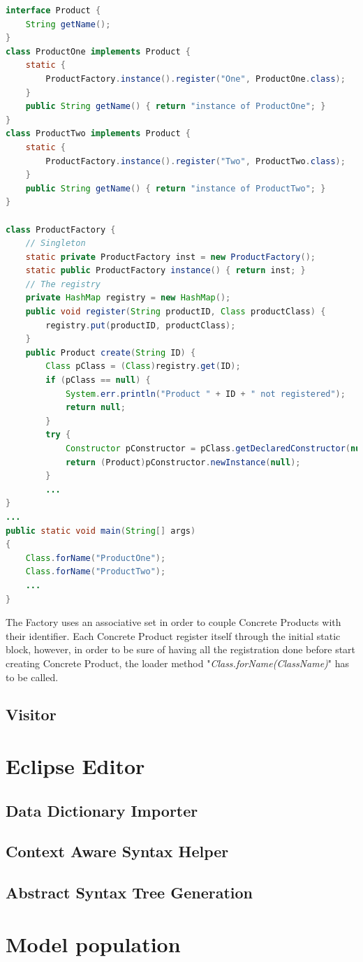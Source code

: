 \begin{lstlisting}[language=Java]
interface Product {
	String getName();
}
class ProductOne implements Product {
	static {
		ProductFactory.instance().register("One", ProductOne.class);
	}
	public String getName() { return "instance of ProductOne"; }
}
class ProductTwo implements Product {
	static {
		ProductFactory.instance().register("Two", ProductTwo.class);
	}
	public String getName() { return "instance of ProductTwo"; }
}

class ProductFactory {
	// Singleton
	static private ProductFactory inst = new ProductFactory();
	static public ProductFactory instance() { return inst; }
	// The registry
	private HashMap registry = new HashMap();
	public void register(String productID, Class productClass) {
		registry.put(productID, productClass);
	}
	public Product create(String ID) {
		Class pClass = (Class)registry.get(ID);
		if (pClass == null) {
			System.err.println("Product " + ID + " not registered");
			return null;
		}
		try {
			Constructor pConstructor = pClass.getDeclaredConstructor(null);
			return (Product)pConstructor.newInstance(null);
		}
        ...
}
...
public static void main(String[] args)
{
	Class.forName("ProductOne");
	Class.forName("ProductTwo");
    ...
}
\end{lstlisting}
The Factory uses an associative set in order to couple Concrete Products with their identifier. Each Concrete Product register itself through the initial static block, however, in order to be sure of having all the registration done before start creating Concrete Product, the loader method "\textit{Class.forName(ClassName)}" has to be called.

\subsection{Visitor}


\section{Eclipse Editor}

\subsection{Data Dictionary Importer}
\label{sec:datadictimp}

\subsection{Context Aware Syntax Helper}

\subsection{Abstract Syntax Tree Generation}

\section{Model population}